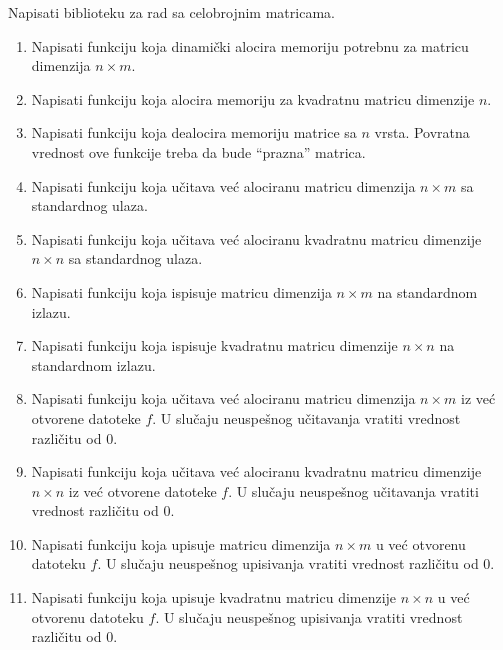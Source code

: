 \begin{Exercise}[label=biblioteka]
Napisati biblioteku za rad sa celobrojnim matricama. 
\begin{enumerate}
\item Napisati funkciju 
  koja dinamički alocira memoriju potrebnu za matricu dimenzija $n
  \times m$.
\item Napisati funkciju  koja alocira memoriju za kvadratnu matricu dimenzije $n$.
\item Napisati funkciju  koja dealocira memoriju matrice sa $n$ vrsta. Povratna vrednost
  ove funkcije treba da bude ``prazna'' matrica.
\item Napisati funkciju  koja učitava već alociranu matricu dimenzija $n \times m$ sa
  standardnog ulaza.
\item Napisati funkciju  koja učitava već alociranu kvadratnu matricu dimenzije
  $n \times n$ sa standardnog ulaza.
\item Napisati funkciju  koja ispisuje matricu dimenzija $n \times m$ na standardnom
  izlazu.
\item Napisati funkciju  koja ispisuje kvadratnu matricu dimenzije $n \times n$ na
  standardnom izlazu.
\item Napisati funkciju  koja učitava već alociranu matricu
  dimenzija $n \times m$ iz već otvorene datoteke $f$. U slučaju
  neuspešnog učitavanja vratiti vrednost različitu od $0$.
\item Napisati funkciju 
  koja učitava već alociranu kvadratnu matricu dimenzije $n \times n$ iz već
  otvorene datoteke $f$.  U slučaju neuspešnog učitavanja vratiti
  vrednost različitu od $0$.
\item Napisati funkciju  koja upisuje matricu dimenzija $n
  \times m$ u već otvorenu datoteku $f$. U slučaju neuspešnog
  upisivanja vratiti vrednost različitu od $0$.
\item Napisati funkciju 
  koja upisuje kvadratnu matricu dimenzije $n \times n$ u već otvorenu datoteku
  $f$. U slučaju neuspešnog upisivanja vratiti vrednost različitu od
  $0$.
\end{enumerate}


\end{Exercise}
